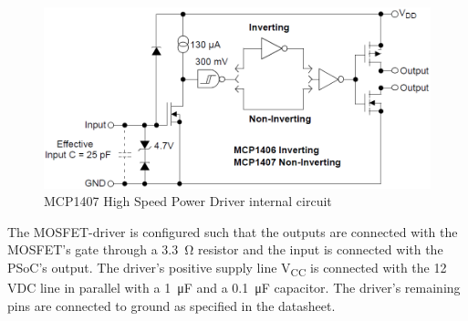 \begin{figure}[H]
	\centering
	\includegraphics[width=0.7\linewidth]{Hardware/LoadSystem/GateDriver}
	\caption{MCP1407 High Speed Power Driver internal circuit}
	\label{fig:MOSFETDriverInternal}
\end{figure}

The MOSFET-driver is configured such that the outputs are connected with the MOSFET's gate through a \SI{3.3}{\ohm} resistor and the input is connected with the PSoC's output. The driver's positive supply line V\textsubscript{CC} is connected with the 12 VDC line in parallel with a \SI{1}{\micro \farad} and a \SI{0.1}{\micro \farad} capacitor. The driver's remaining pins are connected to ground as specified in the datasheet.

